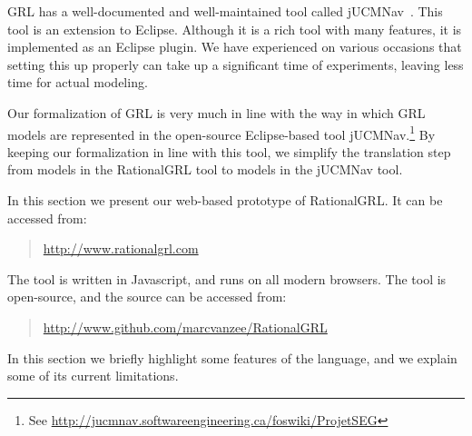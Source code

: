 GRL has a well-documented and well-maintained tool called jUCMNav~\cite{jUCMNav}. This tool is an extension to Eclipse. Although it is a rich tool with many features, it is implemented as an Eclipse plugin. We have experienced on various occasions that setting this up properly can take up a significant time of experiments, leaving less time for actual modeling.

Our formalization of GRL is very much in line with the way in which GRL models are represented in the open-source Eclipse-based tool jUCMNav.\footnote{See \url{http://jucmnav.softwareengineering.ca/foswiki/ProjetSEG}} By keeping our formalization in line with this tool, we simplify the translation step from models in the RationalGRL tool to models in the jUCMNav tool.

In this section we present our web-based prototype of RationalGRL. It can be accessed from:
\begin{quote}
\url{http://www.rationalgrl.com}
\end{quote}

The tool is written in Javascript, and runs on all modern browsers. The tool is open-source, and the source can be accessed from:
\begin{quote}
\url{http://www.github.com/marcvanzee/RationalGRL}
\end{quote}

In this section we briefly highlight some features of the language, and we explain some of its current limitations.

